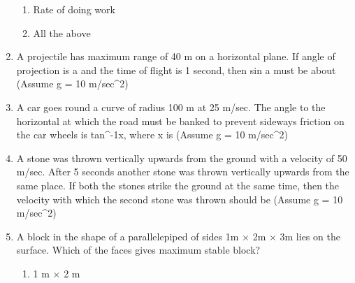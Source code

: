 \documentclass[11pt,a4paper]{article}
\begin{document}
\begin{enumerate}
\begin{enumerate}[label=\Alph*.]
\item{Rate of doing work}
\item{All the above}
\end{enumerate}
\item{A projectile has maximum range of 40 m on a horizontal plane. If angle of projection is a and the time of flight is 1 second, then sin a must be about (Assume g = 10 m/sec\^{}2)
}
\\
\item{A car goes round a curve of radius 100 m at 25 m/sec. The angle to the horizontal at which the road must be banked to prevent sideways friction on the car wheels is tan\^{}-1x, where x is (Assume g = 10 m/sec\^{}2)
}
\\
\item{A stone was thrown vertically upwards from the ground with a velocity of 50 m/sec. After 5 seconds another stone was thrown vertically upwards from the same place. If both the stones strike the ground at the same time, then the velocity with which the second stone was thrown should be (Assume g = 10 m/sec\^{}2)
}
\\
\item{A block in the shape of a parallelepiped of sides 1m $\times$ 2m $\times$ 3m lies on the surface. Which of the faces gives maximum stable block?
}
\begin{enumerate}[label=\Alph*.]
\item{1 m $\times$ 2 m}

\end{enumerate}
\end{enumerate}
\end{document}
